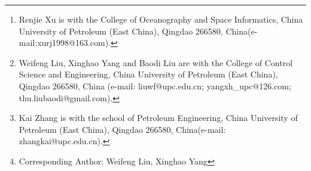 \documentclass[10pt,journal,compsoc]{IEEEtran}
\begin{document}
\author{Renjie~Xu,
        Xinghao~Yang\orcidD{},~
        Baodi~Liu\orcidB{},~\\
        Kai~Zhang\orcidC{},~
        and~Weifeng~Liu\orcidA{},~%
\thanks{Renjie Xu is with the College of Oceanography and Space Informatics, China University of Petroleum (East China), Qingdao 266580, China(e-mail:xurj1998@163.com).}
\thanks{Weifeng Liu, Xinghao Yang and Baodi Liu are with the College of Control Science and Engineering, China University of Petroleum (East China), Qingdao 266580,
China (e-mail: liuwf@upc.edu.cn; yangxh\_upc@126.com; thu.liubaodi@gmail.com).}
\thanks{Kai Zhang is with the school of Petroleum Engineering, China University of Petroleum (East China), Qingdao 266580, China(e-mail: zhangkai@upc.edu.cn).}
\thanks{Corresponding Author: Weifeng Liu, Xinghao Yang}}%


% 
%
\end{document}
